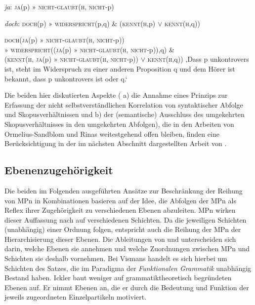 \begin{exe}
	\ex\label{125} 	
	\textit{ja}: \textsc{ja}(p) » \textsc{nicht-glaubt}(\textsc{h}, \textsc{nicht}-p)	
\end{exe}
\begin{exe}
	\ex\label{126} 	
	\textit{doch}: \textsc{doch}(p) » \textsc{widerspricht}(p,q) \& (\textsc{kennt}(\textsc{h},p) $\lor$ \textsc{kennt}(\textsc{h},q))
\end{exe}

\begin{exe}
	\ex\label{127}
		\begin{xlist}	
			\ex\label{127a} \textsc{doch}(\textsc{ja}(p) » \textsc{nicht-glaubt}(\textsc{h}, \textsc{nicht}-p))\\
			» \textsc{widerspricht}((\textsc{ja}(p) » \textsc{nicht-glaubt}(\textsc{h}, \textsc{nicht}-p)),q) \& \\(\textsc{kennt}(\textsc{h}, \textsc{ja}(p) » \textsc{nicht-glaubt}(\textsc{h}, \textsc{nicht}-p)) $\lor$ \textsc{kennt}(\textsc{h},q))
			\ex\label{1247}  ‚Dass p unkontrovers ist, steht im Widerspruch zu einer anderen Proposition q und dem Hörer ist bekannt, dass p unkontrovers ist oder q.‘ 
		\end{xlist}
\end{exe}\largerpage
Die beiden hier diskutierten Aspekte ( a) die Annahme eines Prinzips zur Erfassung der nicht selbstverständlichen Korrelation von syntaktischer Abfolge und Skopusverhältnissen und b) der (semantische) Ausschluss des umgekehrten Skopusverhältnisses in den umgekehrten Abfolgen), die in den Arbeiten von Ormelius-Sandblom und Rinas weitestgehend offen bleiben, finden eine Berücksichtigung in der im nächsten Abschnitt dargestellten Arbeit von \citet{Vismans1994}.

\subsection{Ebenenzugehörigkeit}
\label{sec:ebenen}
Die beiden im Folgenden ausgeführten Ansätze zur Beschränkung der Reihung von MPn in Kombinationen basieren auf der Idee, die Abfolgen der MPn als Reflex ihrer Zugehörigkeit zu verschiedenen Ebenen abzuleiten. MPn wirken dieser Auffassung nach auf verschiedenen Schichten. Da die jeweiligen Schichten (unabhängig) einer Ordnung folgen, entspricht auch die Reihung der MPn der Hie\-rarchisierung dieser Ebenen. Die Ableitungen von \citet{Vismans1994} und \citet{Ickler1994} unterscheiden sich darin, welche Ebenen sie annehmen und welche Zuordnungen zwischen MPn und Schichten sie deshalb vornehmen. Bei Vismans handelt es sich hierbei um Schichten des Satzes, die im Paradigma der \textit{Funktionalen Grammatik} unabhängig Bestand haben. Ickler baut weniger auf grammatiktheoretisch begründeten Ebenen auf. Er nimmt Ebenen an, die er durch die Bedeutung und Funktion der jeweils zugeordneten Einzelpartikeln motiviert.


